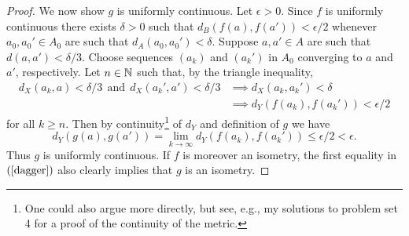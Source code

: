 \begin{proof}
  We now show $g$ is uniformly continuous. Let $\epsilon > 0$. Since
  $f$ is uniformly continuous there exists $\delta > 0$ such that
  $d_B(f(a),f(a')) < \epsilon/2$ whenever $a_0,a_0' \in A_0$ are such
  that $d_A(a_0,a_0') < \delta$. Suppose $a,a' \in A$ are such that
  $d(a,a') < \delta/3$. Choose sequences $(a_k)$ and $(a_k')$ in $A_0$
  converging to $a$ and $a'$, respectively. Let $n \in \mathbb{N}$ such that,
  by the triangle inequality,
  \begin{align*}
    d_X(a_k,a) < \delta/3\ \ \text{and}\ \ d_X(a_k',a') < \delta/3
    &\implies d_X(a_k,a_k') < \delta \\ &\implies d_Y(f(a_k),f(a_k'))
    < \epsilon/2
  \end{align*}
  for all $k \ge n$. Then by continuity\footnote{One could also argue
    more directly, but see, e.g., my solutions to problem set 4 for a
    proof of the continuity of the metric.} of $d_Y$ and definition of
  $g$ we have
  \begin{equation}
    \label{dagger}
    d_Y(g(a),g(a')) = \lim_{k \to \infty} d_Y(f(a_k),f(a_k')) \le
    \epsilon/2 < \epsilon.
  \end{equation}
  Thus $g$ is uniformly continuous. If $f$ is moreover an isometry,
  the first equality in $(\ref{dagger})$ also clearly implies that $g$
  is an isometry.
\end{proof}


